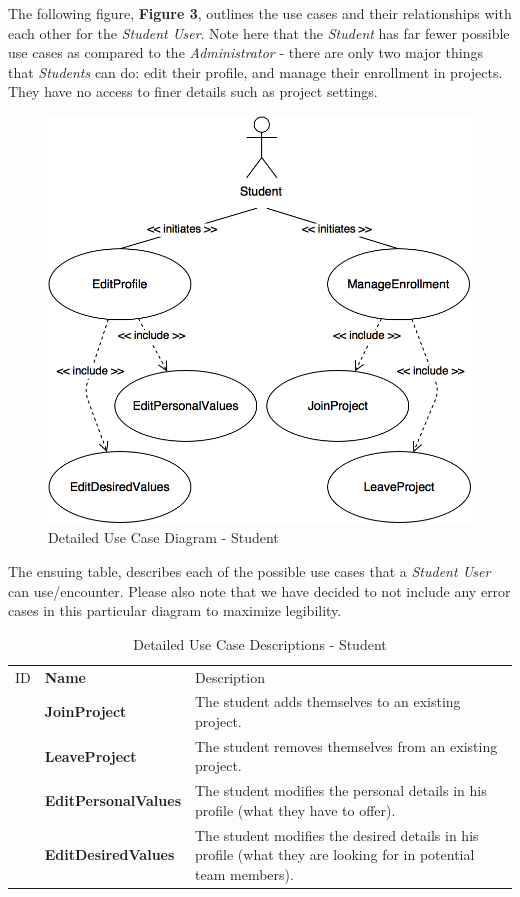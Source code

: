 \documentclass[12pt,letterpaper]{article}
\begin{document}
The following figure, {\bf Figure 3}, outlines the use cases and their relationships with each other for the {\it Student User}. Note here that the {\it Student} has far fewer possible use cases
as compared to the {\it Administrator} - there are only two major things that {\it Students} can do: edit their profile, and manage their enrollment in projects. They have no 
access to finer details such as project settings. 

\begin{figure}[H]
	\centering{}
	\includegraphics[scale=0.25]{imgs/detailed-student-use-case-diagram.png}
	\caption{Detailed Use Case Diagram - Student}
\end{figure}

\newpage{}

The ensuing table,  describes each of the possible use cases that a {\it Student User} can use/encounter.
Please also note that we have decided to not include any error cases in this particular diagram to maximize legibility.

\begin{table}[H]
	\caption{Detailed Use Case Descriptions - Student}
	\begin{tabu} to 
	    \tableheader{}ID & Name & Description\\
		\joinproject{} & JoinProject & The student adds themselves to an existing project.\\
		\leaveproject{} & LeaveProject & The student removes themselves from an existing project.\\
		\editpersonalvalues{} & EditPersonalValues & The student modifies the personal details in his profile (what they have to offer).\\
		\editdesiredvalues{} & EditDesiredValues & The student modifies the desired details in his profile (what they are looking for in potential team members).\\
	\end{tabu}
\end{table}
\end{document}
